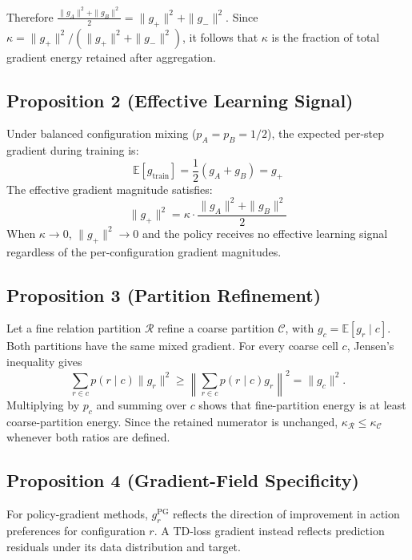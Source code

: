 \documentclass[letterpaper]{article}
\begin{document}
Therefore $\frac{\|g_A\|^2 + \|g_B\|^2}{2} = \|g_+\|^2 + \|g_-\|^2$.
Since $\kappa = \|g_+\|^2 / (\|g_+\|^2 + \|g_-\|^2)$, it follows that $\kappa$ is the
fraction of total gradient energy retained after aggregation.

\subsection{Proposition 2 (Effective Learning Signal)}

Under balanced configuration mixing ($p_A = p_B = 1/2$), the expected per-step
gradient during training is:
\begin{equation}
\mathbb{E}[g_{\text{train}}] = \frac{1}{2}(g_A + g_B) = g_+
\end{equation}
The effective gradient magnitude satisfies:
\begin{equation}
\|g_+\|^2 = \kappa \cdot \frac{\|g_A\|^2 + \|g_B\|^2}{2}
\end{equation}
When $\kappa \to 0$, $\|g_+\|^2 \to 0$ and the policy receives no effective
learning signal regardless of the per-configuration gradient magnitudes.

\subsection{Proposition 3 (Partition Refinement)}

Let a fine relation partition $\mathcal{R}$ refine a coarse partition
$\mathcal{C}$, with $g_c=\mathbb{E}[g_r\mid c]$.
Both partitions have the same mixed gradient. For every coarse cell $c$,
Jensen's inequality gives
\begin{equation}
\sum_{r\in c} p(r\mid c)\|g_r\|^2
\geq
\left\|\sum_{r\in c}p(r\mid c)g_r\right\|^2
=\|g_c\|^2.
\end{equation}
Multiplying by $p_c$ and summing over $c$ shows that fine-partition energy is
at least coarse-partition energy. Since the retained numerator is unchanged,
$\kappa_{\mathcal{R}}\leq\kappa_{\mathcal{C}}$ whenever both ratios are
defined.

\subsection{Proposition 4 (Gradient-Field Specificity)}

For policy-gradient methods, $g_r^{\text{PG}}$ reflects the direction of
improvement in action preferences for configuration $r$. A TD-loss gradient
instead reflects prediction residuals under its data distribution and target.
\end{document}
